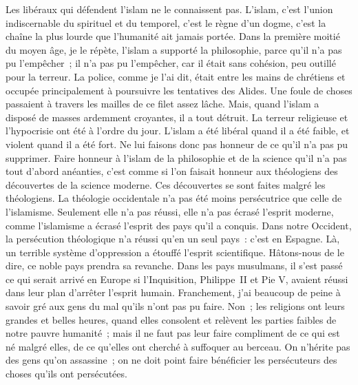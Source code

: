 \documentclass[french,twoside]{book} %
\newcommand\orgName[1]{#1}
\newcommand\persName[1]{#1}
\newcommand\placeName[1]{#1}
\begin{document}
Les libéraux qui défendent l’islam ne le connaissent pas. L’islam, c’est l’union indiscernable du spirituel et du temporel, c’est le règne d’un dogme, c’est la chaîne la plus lourde que l’humanité ait jamais portée. Dans la première moitié du moyen âge, je le répète, l’islam a supporté la philosophie, parce qu’il n’a pas pu l’empêcher ; il n’a pas pu l’empêcher, car il était sans cohésion, peu outillé pour la terreur. La police, comme je l’ai dit, était entre les mains de chrétiens et occupée principalement à poursuivre les tentatives des {\orgName Alides}. Une foule de choses passaient à travers les mailles de ce filet assez lâche. Mais, quand l’islam a disposé de masses ardemment croyantes, il a tout détruit. La terreur religieuse et l’hypocrisie ont été à l’ordre du jour. L’islam a été libéral quand il a été faible, et violent quand il a été fort. Ne lui faisons donc pas honneur de ce qu’il n’a pas pu supprimer. Faire honneur à l’islam de la philosophie et de la science qu’il n’a pas tout d’abord anéanties, c’est comme si l’on faisait honneur aux théologiens des découvertes de la science moderne. Ces découvertes se sont faites malgré les théologiens. La théologie occidentale n’a pas été moins persécutrice que celle de l’islamisme. Seulement elle n’a pas réussi, elle n’a pas écrasé l’esprit moderne, comme l’islamisme a écrasé l’esprit des pays qu’il a conquis. Dans notre {\placeName Occident}, la persécution théologique n’a réussi qu’en un seul pays : c’est en {\placeName Espagne}. Là, un terrible système d’oppression a étouffé l’esprit scientifique. Hâtons-nous de le dire, ce noble pays prendra sa revanche. Dans les pays musulmans, il s’est passé ce qui serait arrivé en {\placeName Europe} si l’Inquisition, {\persName Philippe II} et {\persName Pie V}, avaient réussi dans leur plan d’arrêter l’esprit humain. Franchement, j’ai beaucoup de peine à savoir gré aux gens du mal qu’ils n’ont pas pu faire. Non ; les religions ont leurs grandes et belles heures, quand elles consolent et relèvent les parties faibles de notre pauvre humanité ; mais il ne faut pas leur faire compliment de ce qui est né malgré elles, de ce qu’elles ont cherché à suffoquer au berceau. On n’hérite pas des gens qu’on assassine ; on ne doit point faire bénéficier les persécuteurs des choses qu’ils ont persécutées.\par
\end{document}
